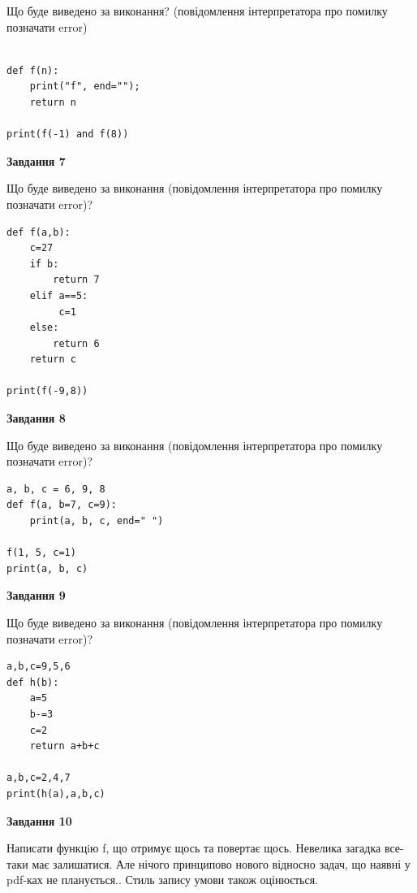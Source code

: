 \documentclass[12pt, ukrainian]{article}
\begin{document}
{\begin {large}
Що буде виведено за виконання? (повідомлення інтерпретатора про помилку позначати error)\par
\begin{verbatim}

def f(n):
    print("f", end="");
    return n

print(f(-1) and f(8))
\end{verbatim}

{\begin {center}\textbf{Завдання 7}\end {center}}

Що буде виведено за виконання (повідомлення інтерпретатора про помилку позначати error)?\par
\begin{verbatim}
def f(a,b):
    c=27
    if b:
        return 7
    elif a==5:
         c=1
    else: 
        return 6
    return c

print(f(-9,8))
\end{verbatim}

{\begin {center}\textbf{Завдання 8}\end {center}}

Що буде виведено за виконання (повідомлення інтерпретатора про помилку позначати error)?\par
\begin{verbatim}
a, b, c = 6, 9, 8
def f(a, b=7, c=9):
    print(a, b, c, end=" ")

f(1, 5, c=1)
print(a, b, c)
\end{verbatim}

{\begin {center}\textbf{Завдання 9}\end {center}}

Що буде виведено за виконання (повідомлення інтерпретатора про помилку позначати error)?\par
\begin{verbatim}
a,b,c=9,5,6
def h(b):
    a=5
    b-=3
    c=2
    return a+b+c

a,b,c=2,4,7
print(h(a),a,b,c)
\end{verbatim}

{\begin {center}\textbf{Завдання 10}\end {center}}


Написати функцiю f, що отримує щось та повертає щось. Невелика загадка все-таки має залишатися. Але нічого принципово нового відносно задач, що наявні у pdf-ках не планується.. Стиль запису умови також оцінюється.\par
\end {large}}
\newpage
\end{document}
